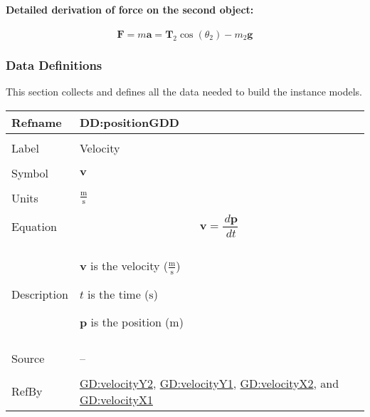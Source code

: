 \documentclass[12pt]{article}
\begin{document}
\paragraph{Detailed derivation of force on the second object:}
\label{GD:yForce2Deriv}
\begin{displaymath}
\symbf{F}=m \symbf{a}={\symbf{T}_{2}} \cos\left({θ_{2}}\right)-{m_{2}} \symbf{g}
\end{displaymath}
\subsubsection{Data Definitions}
\label{Sec:DDs}
This section collects and defines all the data needed to build the instance models.

\vspace{\baselineskip}
\noindent
\begin{minipage}{\textwidth}
\begin{tabular}{>{\raggedright}p{}>{\raggedright\arraybackslash}p{}}
\toprule \textbf{Refname} & \textbf{DD:positionGDD}
\label{DD:positionGDD}
\\ \midrule \\
Label & Velocity
        
\\ \midrule \\
Symbol & $\symbf{v}$
         
\\ \midrule \\
Units & $\frac{\text{m}}{\text{s}}$
        
\\ \midrule \\
Equation & \begin{displaymath}
           \symbf{v}=\frac{\,d\symbf{p}}{\,dt}
           \end{displaymath}
\\ \midrule \\
Description & \begin{symbDescription}
              \item{$\symbf{v}$ is the velocity ($\frac{\text{m}}{\text{s}}$)}
              \item{$t$ is the time (${\text{s}}$)}
              \item{$\symbf{p}$ is the position (${\text{m}}$)}
              \end{symbDescription}
\\ \midrule \\
Source & --
         
\\ \midrule \\
RefBy & \hyperref[GD:velocityY2]{GD:velocityY2}, \hyperref[GD:velocityY1]{GD:velocityY1}, \hyperref[GD:velocityX2]{GD:velocityX2}, and \hyperref[GD:velocityX1]{GD:velocityX1}
        
\\ \bottomrule
\end{tabular}
\end{minipage}
\end{document}
